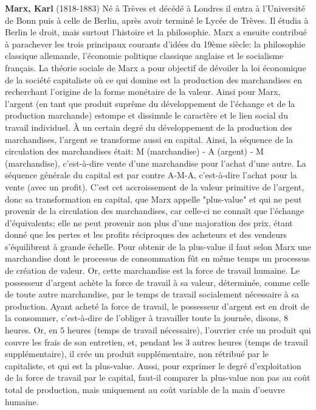 \textbf{Marx, Karl} (1818-1883) Né à Trèves et décédé à Londres il entra à l'Université de Bonn puis à celle de Berlin, après avoir terminé le Lycée de Trèves. Il étudia à Berlin le droit, mais surtout l'histoire et la philosophie. Marx a ensuite contribué à parachever les trois principaux courants d'idées du 19ème siècle: la philosophie classique allemande, l'économie politique classique anglaise et le socialisme français. La théorie sociale de Marx a pour objectif de dévoiler la loi économique de la société capitaliste où ce qui domine est la production des marchandises en recherchant l'origine de la forme monétaire de la valeur. Ainsi pour Marx, l'argent (en tant que produit suprême du développement de l'échange et de la production marchande) estompe et dissimule le caractère et le lien social du travail individuel. À un certain degré du développement de la production des marchandises, l'argent se transforme aussi en capital. Ainsi, la séquence de la circulation des marchandises était: M (marchandise) - A (argent) - M (marchandise), c'est-à-dire vente d'une marchandise pour l'achat d'une autre. La séquence générale du capital est par contre A-M-A, c'est-à-dire l'achat pour la vente (avec un profit). C'est cet accroissement de la valeur primitive de l'argent, donc sa transformation en capital, que Marx appelle "plus-value" et qui ne peut provenir de la circulation des marchandises, car celle-ci ne connaît que l'échange d'équivalents; elle ne peut provenir non plus d'une majoration des prix, étant donné que les pertes et les profits réciproques des acheteurs et des vendeurs s'équilibrent à grande échelle. Pour obtenir de la plus-value il faut selon Marx une marchandise dont le processus de consommation fût en même temps un processus de création de valeur. Or, cette marchandise est la force de travail humaine. Le possesseur d'argent achète la force de travail à sa valeur, déterminée, comme celle de toute autre marchandise, par le temps de travail socialement nécessaire à sa production. Ayant acheté la force de travail, le possesseur d'argent est en droit de la consommer, c'est-à-dire de l'obliger à travailler toute la journée, disons, $8$ heures. Or, en $5$ heures (temps de travail nécessaire), l'ouvrier crée un produit qui couvre les frais de son entretien, et, pendant les $3$ autres heures (temps de travail supplémentaire), il crée un produit supplémentaire, non rétribué par le capitaliste, et qui est la plus-value. Aussi, pour exprimer le degré d'exploitation de la force de travail par le capital, faut-il comparer la plus-value non pas au coût total de production, mais uniquement au coût variable de la main d'oeuvre humaine.

